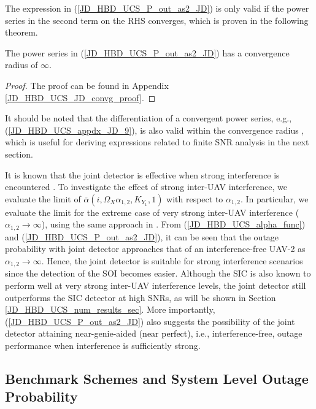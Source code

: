 The expression in (\ref{JD_HBD_UCS_P_out_as2_JD}) is only valid if the power series in the second term on the RHS converges, which is proven in the following theorem.
\begin{theorem}
The power series in (\ref{JD_HBD_UCS_P_out_as2_JD}) has a convergence radius of $\infty$.
\end{theorem}
\begin{proof}
The proof can be found in Appendix \ref{JD_HBD_UCS_JD_convg_proof}.
\end{proof}

It should be noted that the differentiation of a convergent power series, e.g., (\ref{JD_HBD_UCS_appdx_JD_9}), is also valid within the convergence radius \cite{amann2005analysis,gradshteyn2014table}, which is useful for deriving expressions related to finite SNR analysis in the next section.

It is known that the joint detector is effective when strong interference is encountered \cite{zahavi2017cooperation,zhou2015mac,shubhi2017joint,blomer2009transmission}. To investigate the effect of strong inter-UAV interference, we evaluate the limit of $\overline{\alpha}(i,\Omega_X\alpha_{1,2},K_{Y_1},1)$ with respect to $\alpha_{1,2}$. In particular, we evaluate the limit for the extreme case of very strong inter-UAV interference ($\alpha_{1,2} \to \infty$), using the same approach in \cite[eq.(11)]{ernest2019outage}. From (\ref{JD_HBD_UCS_alpha_func}) and (\ref{JD_HBD_UCS_P_out_as2_JD}), it can be seen that the outage probability with joint detector approaches that of an interference-free UAV-2 as $\alpha_{1,2} \to \infty$. Hence, the joint detector is suitable for strong interference scenarios since the detection of the SOI becomes easier. Although the SIC is also known to perform well at very strong inter-UAV interference levels, the joint detector still outperforms the SIC detector at high SNRs, as will be shown in Section \ref{JD_HBD_UCS_num_results_sec}. More importantly, (\ref{JD_HBD_UCS_P_out_as2_JD}) also suggests the possibility of the joint detector attaining near-genie-aided (\textcolor{black}{near perfect}), i.e., interference-free, outage performance when interference is sufficiently strong.

\subsection{Benchmark Schemes and System Level Outage Probability} \label{JD_HBD_UCS_sub_sec_ref_schemes_outage}

